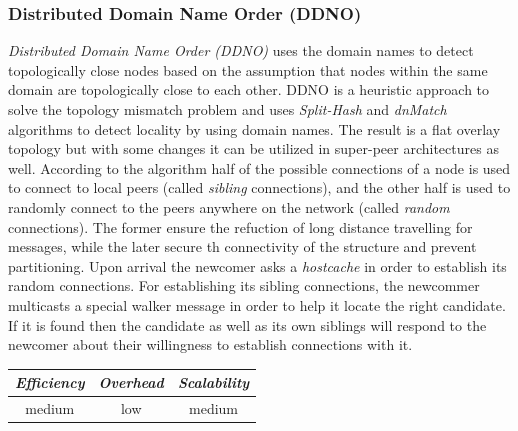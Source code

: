 \subsubsection{Distributed Domain Name Order (DDNO)}
\emph{Distributed Domain Name Order (DDNO)} \cite{z-yk_ddno_2005} uses the
domain names to detect topologically close nodes based on the assumption that
nodes within the same domain are topologically close to each other. DDNO is
a heuristic approach to solve the topology mismatch problem and uses
\emph{Split-Hash} and \emph{dnMatch} algorithms to detect locality by using
domain names. The result is a flat overlay topology but with some changes it
can be utilized in super-peer architectures as well. According to the algorithm
half of the possible connections of a node is used to connect to local peers
(called \emph{sibling} connections), and the other half is used to randomly
connect to the peers anywhere on the network (called \emph{random} connections).
The former ensure the refuction of long distance travelling for messages, while
the later secure th connectivity of the structure and prevent partitioning. Upon
arrival the newcomer asks a \emph{hostcache} in order to establish its random
connections. For establishing its sibling connections, the newcommer multicasts
a special walker message in order to help it locate the right candidate. If it
is found then the candidate as well as its own siblings will respond to the
newcomer about their willingness to establish connections with it.

\begin{center}
\begin{tabular}{ccc}
\emph{Efficiency} & \emph{Overhead} & \emph{Scalability} \\
\hline
medium &
low &
medium
\end{tabular}
\end{center}

